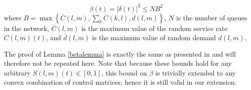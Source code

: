 \begin{Lem} \label{betalemma}
\begin{equation}\label{betabound}
\beta(t)  = \big| \delta(t) \big|^2 \leq NB^2 \end{equation}
where $B =\max \left\{ \overline{C}(l,m), \sum_{k} \overline{C}(k,l),  \overline{d}(l,m) \right\}$, 
$N$ is the number of queues in the network, $\overline{C} (l,m)$ is the maximum value of the random service rate $C(l,m)(t)$, and $ \overline{d}(l,m)$ is the maximum value of random demand $d(l,m)$.
\end{Lem}
The proof of Lemma \ref{betalemma} is exactly the same as presented in \cite{Varaiya2013} and will therefore not be repeated here. Note that because these bounds hold for any arbitrary $S(l,m)(t) \in [0,1]$, this bound on $\beta$ is trivially extended to any convex combination of control matrices; hence it is still valid in our extension.


